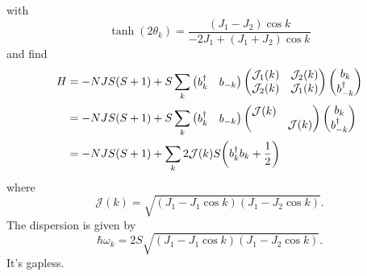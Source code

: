 \documentclass{article}
\begin{document}
with
\[ \tanh(2\theta_k) = \frac{(J_1 - J_2)\cos k}{-2J_1 + (J_1 + J_2) \cos k} \]
and find
\begin{align*}
    H &= -NJS(S+1) + S\sum_k \begin{pmatrix}
        b^\dagger_k & b_{-k}
    \end{pmatrix} \begin{pmatrix}
        \mathcal{J}_1(k) & \mathcal{J}_2(k) \\
        \mathcal{J}_2(k) & \mathcal{J}_1(k)
    \end{pmatrix} \begin{pmatrix}
        b_k \\ b^\dagger_{-k}
    \end{pmatrix} \\
    &= -NJS(S+1) + S\sum_k \begin{pmatrix}
        b^\dagger_k & b_{-k}
    \end{pmatrix} \begin{pmatrix}
        \mathcal{J}(k) & \\
        & \mathcal{J}(k)
    \end{pmatrix} \begin{pmatrix}
        b_k \\ b^\dagger_{-k}
    \end{pmatrix} \\
    &= -NJS(S+1) + \sum_k 2\mathcal{J}(k)S \qty(b^\dagger_k b_k + \frac{1}{2})
\end{align*}
where
\[ \mathcal{J}(k) = \sqrt{(J_1 - J_1\cos k)(J_1 - J_2 \cos k)}. \]
The dispersion is given by
\[ \hbar\omega_k = 2S\sqrt{(J_1 - J_1\cos k)(J_1 - J_2 \cos k)}. \]
It's gapless.

% 
% 
\end{document}
